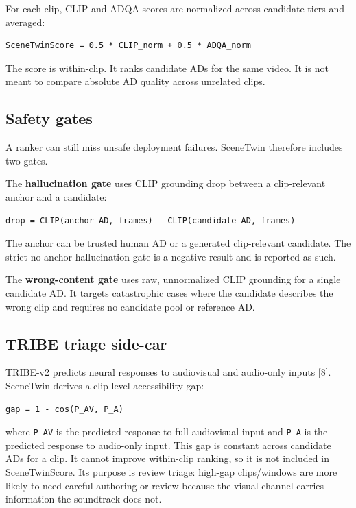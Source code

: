 \documentclass[10pt,twocolumn]{article}
\begin{document}
For each clip, CLIP and ADQA scores are normalized across candidate tiers and averaged:


\begin{verbatim}
SceneTwinScore = 0.5 * CLIP_norm + 0.5 * ADQA_norm
\end{verbatim}

The score is within-clip. It ranks candidate ADs for the same video. It is not meant to compare absolute AD quality across unrelated clips.


\subsection{Safety gates}

A ranker can still miss unsafe deployment failures. SceneTwin therefore includes two gates.


The \textbf{hallucination gate} uses CLIP grounding drop between a clip-relevant anchor and a candidate:


\begin{verbatim}
drop = CLIP(anchor AD, frames) - CLIP(candidate AD, frames)
\end{verbatim}

The anchor can be trusted human AD or a generated clip-relevant candidate. The strict no-anchor hallucination gate is a negative result and is reported as such.


The \textbf{wrong-content gate} uses raw, unnormalized CLIP grounding for a single candidate AD. It targets catastrophic cases where the candidate describes the wrong clip and requires no candidate pool or reference AD.


\subsection{TRIBE triage side-car}

TRIBE-v2 predicts neural responses to audiovisual and audio-only inputs [8]. SceneTwin derives a clip-level accessibility gap:


\begin{verbatim}
gap = 1 - cos(P_AV, P_A)
\end{verbatim}

where \texttt{P\_AV} is the predicted response to full audiovisual input and \texttt{P\_A} is the predicted response to audio-only input. This gap is constant across candidate ADs for a clip. It cannot improve within-clip ranking, so it is not included in SceneTwinScore. Its purpose is review triage: high-gap clips/windows are more likely to need careful authoring or review because the visual channel carries information the soundtrack does not.
\end{document}
